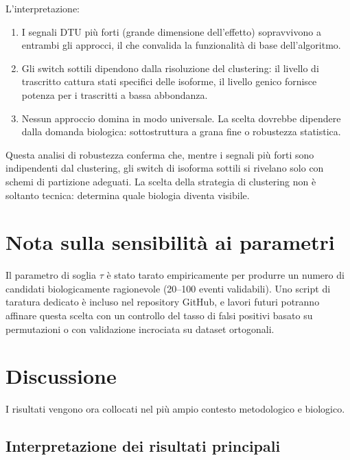 L'interpretazione:
\begin{enumerate}
    \item I segnali DTU più forti (grande dimensione dell'effetto) sopravvivono a entrambi gli approcci, il che convalida la funzionalità di base dell'algoritmo.
    
    \item Gli switch sottili dipendono dalla risoluzione del clustering: il livello di trascritto cattura stati specifici delle isoforme, il livello genico fornisce potenza per i trascritti a bassa abbondanza.
    
    \item Nessun approccio domina in modo universale. La scelta dovrebbe dipendere dalla domanda biologica: sottostruttura a grana fine o robustezza statistica.
\end{enumerate}

Questa analisi di robustezza conferma che, mentre i segnali più forti sono indipendenti dal clustering, gli switch di isoforma sottili si rivelano solo con schemi di partizione adeguati. La scelta della strategia di clustering non è soltanto tecnica: determina quale biologia diventa visibile.

\section*{Nota sulla sensibilità ai parametri}

Il parametro di soglia $\tau$ è stato tarato empiricamente per produrre un numero di candidati biologicamente ragionevole (20--100 eventi validabili). Uno script di taratura dedicato è incluso nel repository GitHub, e lavori futuri potranno affinare questa scelta con un controllo del tasso di falsi positivi basato su permutazioni o con validazione incrociata su dataset ortogonali.

\section{Discussione}\label{sec:discussion}

I risultati vengono ora collocati nel più ampio contesto metodologico e biologico.

\subsection*{Interpretazione dei risultati principali}

